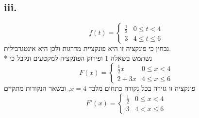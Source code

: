 \subsection{iii.}
\[
	f(t) = \begin{cases}
		\frac{1}{2} & 0 \le t < 4 \\
		3 & 4 \le t \le 6
	\end{cases}
\]
נבחין כי פונקציה זו היא פונקציית מדרגות ולכן היא אינטגרבילית. \\*
נשתמש בשאלה 1 ופירוק הפונקציה למקטעים ונקבל כי
\[
	F(x) = \begin{cases}
		\frac{1}{2}x & 0 \le x < 4 \\
		2 + 3x & 4 \le x \le 6
	\end{cases}
\]
פונקציה זו גזירה בכל נקודה בתחום מלבד $x = 4$, ובשאר הנקודות מתקיים
\[
	F'(x) = \begin{cases}
		\frac{1}{2} & 0 \le x < 4 \\
		3 & 4 < x \le 6
	\end{cases}
\]

